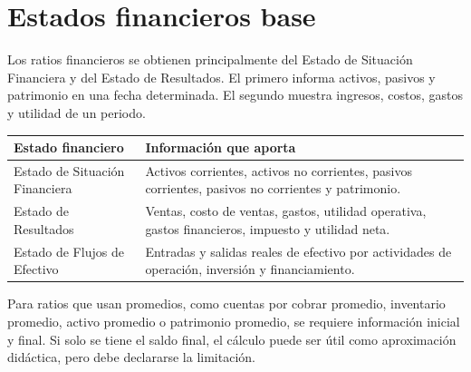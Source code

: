 \section{Estados financieros base}
Los ratios financieros se obtienen principalmente del Estado de Situación Financiera y del Estado de Resultados. El primero informa activos, pasivos y patrimonio en una fecha determinada. El segundo muestra ingresos, costos, gastos y utilidad de un periodo.

\begin{table}[h]
\centering
\begin{tabular}{p{}p{}}
\toprule
Estado financiero & Información que aporta \\
\midrule
Estado de Situación Financiera & Activos corrientes, activos no corrientes, pasivos corrientes, pasivos no corrientes y patrimonio. \\
Estado de Resultados & Ventas, costo de ventas, gastos, utilidad operativa, gastos financieros, impuesto y utilidad neta. \\
Estado de Flujos de Efectivo & Entradas y salidas reales de efectivo por actividades de operación, inversión y financiamiento. \\
\bottomrule
\end{tabular}
\end{table}

Para ratios que usan promedios, como cuentas por cobrar promedio, inventario promedio, activo promedio o patrimonio promedio, se requiere información inicial y final. Si solo se tiene el saldo final, el cálculo puede ser útil como aproximación didáctica, pero debe declararse la limitación.

